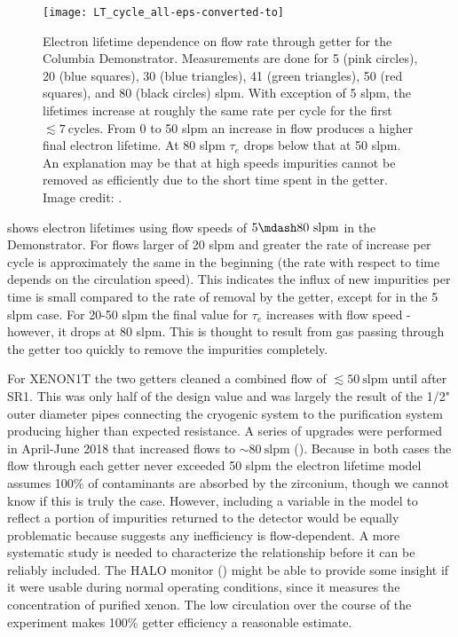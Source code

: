 \begin{figure}
\centering
\texttt{[image: LT\_cycle\_all-eps-converted-to]}
\caption{Electron lifetime dependence on flow rate through getter for the Columbia Demonstrator.  Measurements are done for 5 (pink
circles), 20 (blue squares), 30 (blue
triangles), 41 (green triangles), 50 (red squares), and 80 (black circles) slpm.  With exception of 5 slpm, the lifetimes increase
at roughly the same rate per cycle for the first $\lesssim 7\ \mathrm{cycles}$.  From 0 to 50 slpm an increase in flow produces a higher
final electron
lifetime.  At 80 slpm $\tau_e$ drops below that at 50 slpm.  An explanation may be that at high speeds impurities cannot be removed as
efficiently due to the short time spent in the getter.  Image credit: .}
\label{fig:electron_lifetime_model_removal_demonstrator_circ}
\end{figure}

 shows electron lifetimes using flow speeds of $5 \mdash 80\ \mathrm{slpm}$
in the Demonstrator.  For flows larger of 20 slpm and greater the rate of increase per cycle is approximately the same in the beginning
(the rate with respect to time depends on the circulation speed).  This indicates the influx of new impurities per time is small
compared to the rate of removal by the getter, except for in the 5 slpm case.  For 20-50 slpm the final
value for $\tau_e$ increases with flow speed - however, it drops at 80 slpm.  This is thought
to result from gas passing through the getter too quickly to remove the impurities completely.

For XENON1T the two getters cleaned a combined flow of $\lesssim 50\ \mathrm{slpm}$ until after SR1.  This was only half of the design
value and was largely the result of the 1/2" outer diameter pipes connecting the cryogenic system to the purification system producing
higher than expected
resistance.  A series of upgrades were performed in April-June 2018 that increased flows to ${\sim} 80\ \mathrm{slpm}$
().  Because in both cases the flow through each getter never exceeded 50 slpm the electron
lifetime model assumes 100\% of contaminants are absorbed by the zirconium, though we cannot know if this is truly the case.  However,
including a variable in the model to reflect a portion of impurities returned
to the detector would be equally problematic because  suggests any
inefficiency is
flow-dependent.  A more systematic study is needed to characterize the relationship before it can be reliably included.  The HALO
monitor () might be able to provide some insight if it were usable during normal operating conditions, since it
measures the  concentration of purified xenon.  The low
circulation over the course of the experiment makes 100\% getter efficiency a reasonable estimate.

